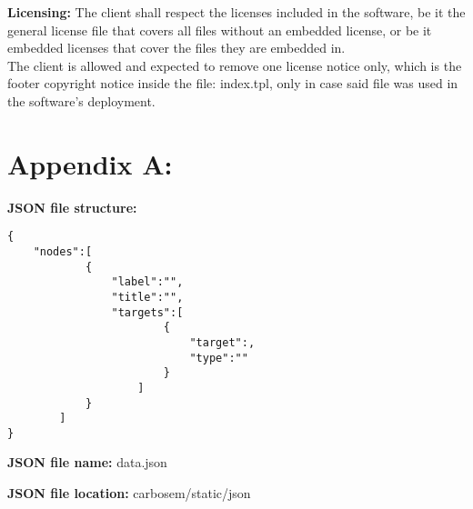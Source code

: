 \documentclass[12pt]{report}
\begin{document}
\textbf{Licensing:}
The client shall respect the licenses included in the software, be it the general license file that covers all files without an embedded license, or be it embedded licenses that cover the files they are embedded in.\\

The client is allowed and expected to remove one license notice only, which is the footer copyright notice inside the file: index.tpl, only in case said file was used in the software's deployment.\\

\newpage
\section{Appendix A:}
\textbf{JSON file structure:}
\begin{lstlisting}[JSON]
{
	"nodes":[
			{
				"label":"",
				"title":"",
				"targets":[
						{
							"target":,
							"type":""
						}
					]
			}
		]
}
\end{lstlisting}

\textbf{JSON file name:}
data.json

\textbf{JSON file location:}
carbosem/static/json
\end{document}
